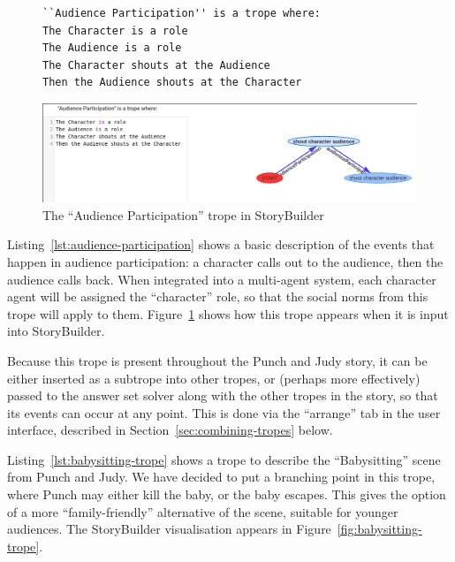 \documentclass[11pt]{report}
\begin{document}
\begin{figure}[!t]
\begin{lstlisting}[label={lst:audience-participation},caption={The ``Audience participation'' trope}]
``Audience Participation'' is a trope where:
The Character is a role
The Audience is a role
The Character shouts at the Audience
Then the Audience shouts at the Character
\end{lstlisting}

\smallskip

\centerline{\includegraphics[width=\textwidth]{audience-trope.png}}
\caption{The ``Audience Participation'' trope in StoryBuilder}\label{fig:audience-participation}
\end{figure}

Listing~\ref{lst:audience-participation} shows a basic description of the events
that happen in audience participation: a character calls out to the audience,
then the audience calls back. When integrated into a multi-agent system, each
character agent will be assigned the ``character'' role, so that the social
norms from this trope will apply to them.
Figure~\ref{fig:audience-participation} shows how this trope appears when it is
input into StoryBuilder.

Because this trope is present throughout the Punch and Judy story, it can be
either inserted as a subtrope into other tropes, or (perhaps more effectively)
passed to the answer set solver along with the other tropes in the story, so
that its events can occur at any point. This is done via the ``arrange'' tab in
the user interface, described in Section~\ref{sec:combining-tropes} below.

Listing~\ref{lst:babysitting-trope} shows a trope to describe the
``Babysitting'' scene from Punch and Judy. We have decided to put a branching
point in this trope, where Punch may either kill the baby, or the baby escapes.
This gives the option of a more ``family-friendly'' alternative of the scene,
suitable for younger audiences. The StoryBuilder visualisation appears in Figure~\ref{fig:babysitting-trope}.
\end{document}
